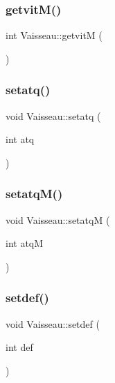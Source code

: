 \mbox{\label{class_vaisseau_a78f7e268cdb61a39e3292e80309a4ca8}} 
\subsubsection{\texorpdfstring{getvit\+M()}{getvitM()}}
{\footnotesize\ttfamily int Vaisseau\+::getvitM (\begin{DoxyParamCaption}{ }\end{DoxyParamCaption})}

\mbox{\label{class_vaisseau_a5dac2a3814de298d8d515c20b7463397}} 
\subsubsection{\texorpdfstring{setatq()}{setatq()}}
{\footnotesize\ttfamily void Vaisseau\+::setatq (\begin{DoxyParamCaption}\item[{int}]{atq }\end{DoxyParamCaption})}

\mbox{\label{class_vaisseau_ac1eaf0b717e81471f259ce94ad0afb20}} 
\subsubsection{\texorpdfstring{setatq\+M()}{setatqM()}}
{\footnotesize\ttfamily void Vaisseau\+::setatqM (\begin{DoxyParamCaption}\item[{int}]{atqM }\end{DoxyParamCaption})}

\mbox{\label{class_vaisseau_aa6a93a1d1bfd8f7bac3e079fff6d84fa}} 
\subsubsection{\texorpdfstring{setdef()}{setdef()}}
{\footnotesize\ttfamily void Vaisseau\+::setdef (\begin{DoxyParamCaption}\item[{int}]{def }\end{DoxyParamCaption})}

